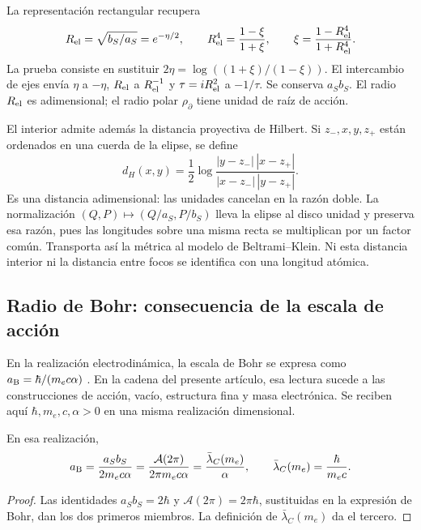La representación rectangular recupera
\begin{equation}
 R_{\rm el}=\sqrt{b_S/a_S}=e^{-\eta/2},\qquad
 R_{\rm el}^4=\frac{1-\xi}{1+\xi},\qquad
 \xi=\frac{1-R_{\rm el}^4}{1+R_{\rm el}^4}.
 \label{eq:ii-elipse-reciproca}
\end{equation}
La prueba consiste en sustituir
\(2\eta=\log((1+\xi)/(1-\xi))\). El intercambio de ejes
envía \(\eta\) a \(-\eta\), \(R_{\rm el}\) a
\(R_{\rm el}^{-1}\) y \(\tau=iR_{\rm el}^2\) a \(-1/\tau\).
Se conserva \(a_Sb_S\). El radio \(R_{\rm el}\) es adimensional;
el radio polar \(\rho_{\partial}\) tiene unidad de raíz de acción.

El interior admite además la distancia proyectiva de Hilbert. Si
\(z_-,x,y,z_+\) están ordenados en una cuerda de la elipse, se define
\[
 d_H(x,y)=\frac12\log
 \frac{|y-z_-|\,|x-z_+|}{|x-z_-|\,|y-z_+|}.
\]
Es una distancia adimensional: las unidades cancelan en la razón doble.
La normalización \((Q,P)\mapsto(Q/a_S,P/b_S)\) lleva la elipse
al disco unidad y preserva esa razón, pues las longitudes sobre una
misma recta se multiplican por un factor común. Transporta así la métrica
al modelo de Beltrami--Klein. Ni esta distancia interior ni la distancia
entre focos se identifica con una longitud atómica.

\subsection{Radio de Bohr: consecuencia de la escala de acción}
\label{sec:ii-elipse-bohr}

En la realización electrodinámica, la escala de Bohr se expresa como
\(a_{\rm B}=\hbar/(m_ec\alpha)\) \cite{codata2022}. En la cadena
del presente artículo, esa lectura sucede a las construcciones de
acción, vacío, estructura fina y masa electrónica. Se reciben aquí
\(\hbar,m_e,c,\alpha>0\) en una misma realización dimensional.
\begin{proposition}
\label{prop:ii-elipse-bohr}
En esa realización,
\begin{equation}
 a_{\rm B}=\frac{a_Sb_S}{2m_ec\alpha}
 =\frac{\mathcal A(2\pi)}{2\pi m_ec\alpha}
 =\frac{\bar\lambda_C(m_e)}{\alpha},\qquad
 \bar\lambda_C(m_e)=\frac{\hbar}{m_ec}.
 \label{eq:ii-elipse-bohr}
\end{equation}
\end{proposition}
\begin{proof}
Las identidades \(a_Sb_S=2\hbar\) y
\(\mathcal A(2\pi)=2\pi\hbar\), sustituidas en la expresión
de Bohr, dan los dos primeros miembros. La definición de
\(\bar\lambda_C(m_e)\) da el tercero.
\end{proof}

